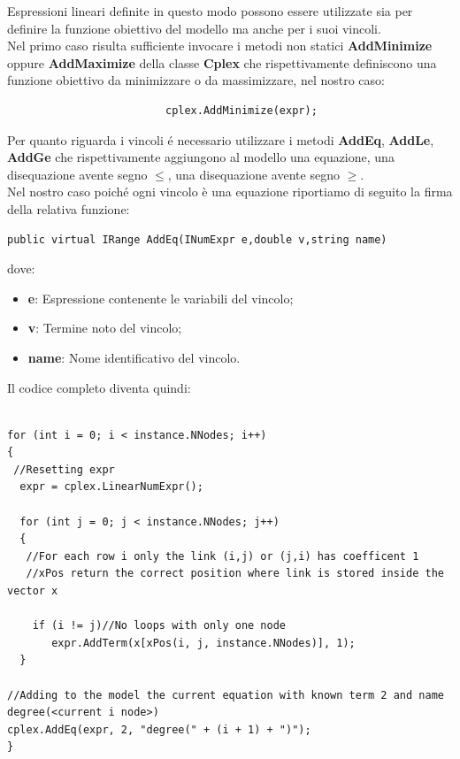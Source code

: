 \documentclass[11pt]{article}
\begin{document}
Espressioni lineari definite in questo modo possono essere utilizzate sia per definire la funzione obiettivo del modello ma anche per i suoi vincoli.\\
Nel primo caso risulta sufficiente invocare i metodi non statici \textbf{AddMinimize} oppure \textbf{AddMaximize} della classe \textbf{Cplex} che rispettivamente definiscono una funzione obiettivo da minimizzare o da massimizzare, nel nostro caso:            


\begin{lstlisting}
                         cplex.AddMinimize(expr);         
\end{lstlisting}

Per quanto riguarda i vincoli \'e necessario utilizzare i metodi \textbf{AddEq}, \textbf{AddLe}, \textbf{AddGe} che rispettivamente aggiungono al modello una equazione, una disequazione avente segno $\leq$, una disequazione avente segno $\geq$.\\
Nel nostro caso poich\'e ogni vincolo \`e una equazione riportiamo di seguito la firma della relativa funzione:

\begin{lstlisting}
public virtual IRange AddEq(INumExpr e,double v,string name)
\end{lstlisting}

dove:

\begin{itemize}
	\item \textbf{e}: Espressione contenente le variabili del vincolo;
	\item \textbf{v}: Termine noto del vincolo;
	\item \textbf{name}: Nome identificativo del vincolo.
\end{itemize}

Il codice completo diventa quindi:

\begin{lstlisting}

for (int i = 0; i < instance.NNodes; i++)
{
 //Resetting expr
  expr = cplex.LinearNumExpr();

  for (int j = 0; j < instance.NNodes; j++)
  {
   //For each row i only the link (i,j) or (j,i) has coefficent 1
   //xPos return the correct position where link is stored inside the vector x
    
    if (i != j)//No loops with only one node
       expr.AddTerm(x[xPos(i, j, instance.NNodes)], 1);               
  }

//Adding to the model the current equation with known term 2 and name degree(<current i node>)
cplex.AddEq(expr, 2, "degree(" + (i + 1) + ")");
}

\end{lstlisting}
\end{document}
